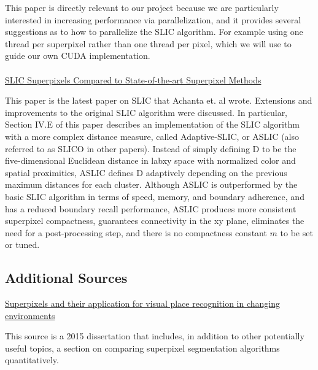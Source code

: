 \documentclass[11pt]{article}
\begin{document}
This paper is directly relevant to our project because we are particularly interested in increasing performance via parallelization, and it provides several suggestions as to how to parallelize the SLIC algorithm. For example using one thread per superpixel rather than one thread per pixel, which we will use to guide our own CUDA implementation.\\\\

\hyperlink{https://infoscience.epfl.ch/record/177415/files/Superpixel_PAMI2011-2.pdf}{SLIC Superpixels Compared to State-of-the-art Superpixel Methods} \cite{slic2012}

This paper is the latest paper on SLIC that Achanta et. al wrote. Extensions and improvements to the original SLIC algorithm were discussed. In particular, Section IV.E of this paper describes an implementation of the SLIC algorithm with a more complex distance measure, called Adaptive-SLIC, or ASLIC (also referred to as SLICO in other papers). Instead of simply defining D to be the five-dimensional Euclidean distance in labxy space with normalized color and spatial proximities, ASLIC defines D adaptively depending on the previous maximum distances for each cluster. Although ASLIC is outperformed by the basic SLIC algorithm in terms of speed, memory, and boundary adherence, and has a reduced boundary recall performance, ASLIC produces more consistent superpixel compactness, guarantees connectivity in the xy plane, eliminates the need for a post-processing step, and there is no compactness constant $m$ to be set or tuned.

\subsection*{Additional Sources}

\hyperlink{http://www.qucosa.de/fileadmin/data/qucosa/documents/19024/peer_neubert_online.pdf}{Superpixels and their application for visual place recognition in changing environments} \cite{dissertationneubert}

This source is a 2015 dissertation that includes, in addition to other potentially useful topics, a section on comparing superpixel segmentation algorithms quantitatively.
\end{document}
